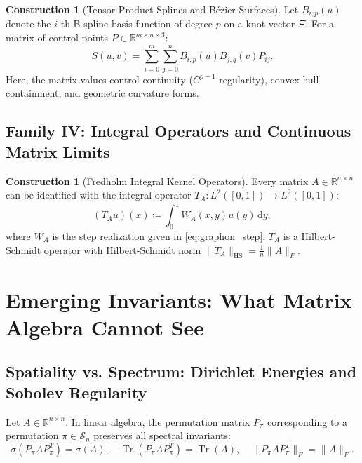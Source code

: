 \documentclass[11pt,a4paper,reqno]{amsart}
\theoremstyle{definition}
\newtheorem{construction}[theorem]{Construction}
\numberwithin{equation}{section}
\providecommand{\R}{\mathbb{R}}
\newcommand{\Tr}{\operatorname{Tr}}
\newcommand{\dif}{\,\mathrm{d}}
\providecommand{\R}{\mathbb{R}}
\begin{document}
\begin{construction}[Tensor Product Splines and B\'ezier Surfaces]
Let $B_{i, p}(u)$ denote the $i$-th B-spline basis function of degree $p$ on a knot vector $\Xi$. For a matrix of control points $P \in \R^{m \times n \times 3}$:
\begin{equation}
    S(u, v) = \sum_{i=0}^m \sum_{j=0}^n B_{i, p}(u) B_{j, q}(v) P_{ij}.
\end{equation}
Here, the matrix values control continuity ($C^{p-1}$ regularity), convex hull containment, and geometric curvature forms.
\end{construction}

\subsection{Family IV: Integral Operators and Continuous Matrix Limits}
\label{subsec:fam4}

\begin{construction}[Fredholm Integral Kernel Operators]
Every matrix $A \in \R^{n \times n}$ can be identified with the integral operator $T_A \colon L^2([0, 1]) \to L^2([0, 1])$:
\begin{equation}
    (T_A u)(x) \coloneqq \int_0^1 W_A(x, y) u(y) \dif y,
\end{equation}
where $W_A$ is the step realization given in \eqref{eq:graphon_step}. $T_A$ is a Hilbert-Schmidt operator with Hilbert-Schmidt norm $\|T_A\|_{\mathrm{HS}} = \frac{1}{n} \|A\|_F$.
\end{construction}

\section{Emerging Invariants: What Matrix Algebra Cannot See}
\label{sec:emerging_invariants}

\subsection{Spatiality vs. Spectrum: Dirichlet Energies and Sobolev Regularity}
\label{subsec:sobolev}

Let $A \in \R^{n \times n}$. In linear algebra, the permutation matrix $P_\pi$ corresponding to a permutation $\pi \in \mathcal{S}_n$ preserves all spectral invariants:
\begin{equation}
    \sigma(P_\pi A P_\pi^T) = \sigma(A), \quad \Tr(P_\pi A P_\pi^T) = \Tr(A), \quad \|P_\pi A P_\pi^T\|_F = \|A\|_F.
\end{equation}
\end{document}
